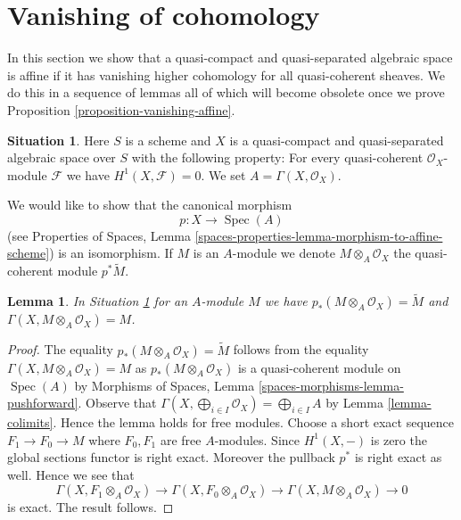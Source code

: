 \documentclass{stacks-project}
\theoremstyle{plain}
\newtheorem{lemma}[subsection]{Lemma}
\theoremstyle{definition}
\newtheorem{situation}[subsection]{Situation}
\theoremstyle{remark}
\numberwithin{equation}{subsection}
\def\Spec{\mathop{\mathrm{Spec}}}
\begin{document}
\section{Vanishing of cohomology}
\label{section-vanishing}

\noindent
In this section we show that a quasi-compact and quasi-separated
algebraic space is affine if it has vanishing higher cohomology
for all quasi-coherent sheaves. We do this in a sequence of lemmas
all of which will become obsolete once we prove
Proposition \ref{proposition-vanishing-affine}.

\begin{situation}
\label{situation-vanishing}
Here $S$ is a scheme and $X$ is a quasi-compact and quasi-separated
algebraic space over $S$ with the following property: For every
quasi-coherent $\mathcal{O}_X$-module $\mathcal{F}$ we have
$H^1(X, \mathcal{F}) = 0$. We set $A = \Gamma(X, \mathcal{O}_X)$.
\end{situation}

\noindent
We would like to show that the canonical morphism
$$
p : X \longrightarrow \Spec(A)
$$
(see Properties of Spaces, Lemma
\ref{spaces-properties-lemma-morphism-to-affine-scheme}) is an isomorphism.
If $M$ is an $A$-module we denote $M \otimes_A \mathcal{O}_X$
the quasi-coherent module $p^*\tilde M$.

\begin{lemma}
\label{lemma-vanishing-compute}
In Situation \ref{situation-vanishing} for an $A$-module $M$ we have
$p_*(M \otimes_A \mathcal{O}_X) = \widetilde{M}$ and
$\Gamma(X, M \otimes_A \mathcal{O}_X) = M$.
\end{lemma}

\begin{proof}
The equality $p_*(M \otimes_A \mathcal{O}_X) = \widetilde{M}$ follows
from the equality $\Gamma(X, M \otimes_A \mathcal{O}_X) = M$ as
$p_*(M \otimes_A \mathcal{O}_X)$ is a quasi-coherent module on
$\Spec(A)$ by Morphisms of Spaces, Lemma
\ref{spaces-morphisms-lemma-pushforward}.
Observe that $\Gamma(X, \bigoplus_{i \in I} \mathcal{O}_X) =
\bigoplus_{i \in I} A$ by Lemma \ref{lemma-colimits}. Hence the
lemma holds for free modules. Choose a short exact sequence
$F_1 \to F_0 \to M$ where $F_0, F_1$ are free $A$-modules. Since
$H^1(X, -)$ is zero the global sections functor is right exact.
Moreover the pullback $p^*$ is right exact as well. Hence we see
that
$$
\Gamma(X, F_1 \otimes_A \mathcal{O}_X) \to
\Gamma(X, F_0 \otimes_A \mathcal{O}_X) \to
\Gamma(X, M \otimes_A \mathcal{O}_X) \to 0
$$
is exact. The result follows.
\end{proof}
\end{document}
